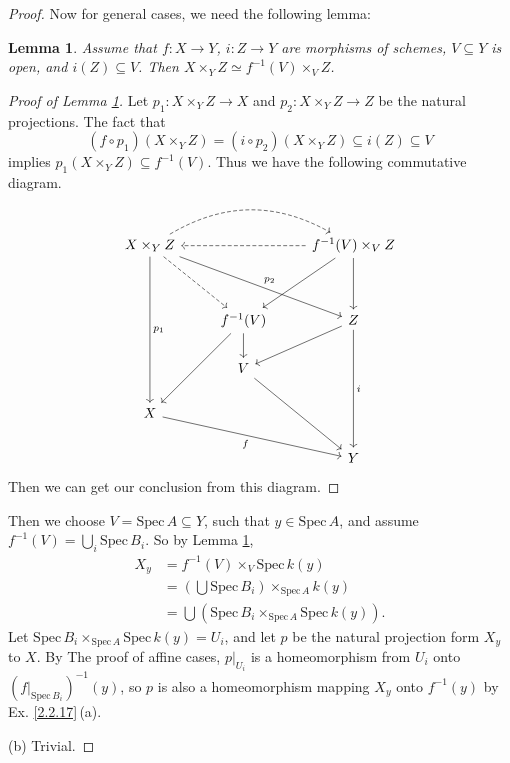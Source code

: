 \documentclass{amsart}
\newtheorem{lm}[theorem]{Lemma}
\begin{document}
\begin{proof}
	Now for general cases, we need the following lemma:
	\begin{lm}
		\label{l12}
		Assume that $f:X\rightarrow Y$, $i:Z\rightarrow Y$ are morphisms of schemes, $V\subseteq Y$ is open, and $i(Z)\subseteq V$. Then $X\times_YZ\simeq f^{-1}(V)\times_VZ$.
	\end{lm}
    \begin{proof}[Proof of Lemma \ref*{l12}]
    	Let $p_1:X\times_YZ\to X$ and $p_2:X\times_YZ\to Z$ be the natural projections. The fact that $$(f\circ p_1)(X\times_YZ)=(i\circ p_2)(X\times_YZ)\subseteq i(Z)\subseteq V$$implies $p_1(X\times_YZ)\subseteq f^{-1}(V)$. Thus we have the following commutative diagram.
    	\begin{equation*}
    	\begin{tikzcd}
    	X\times_YZ \arrow[dddd, "p_1"] \arrow[rrdd, "p_2"] \arrow[rdd, dashed] \arrow[rr, dashed, bend left] &                                 & f^{-1}(V)\times_VZ \arrow[ldd] \arrow[dd] \arrow[ll, dashed] \\
    	&                                 &                                                              \\
    	& f^{-1}(V) \arrow[ldd] \arrow[d] & Z \arrow[ddd, "i"] \arrow[ld]                                \\
    	& V \arrow[rdd]                   &                                                              \\
    	X \arrow[rrd, "f"']                                                                                  &                                 &                                                              \\
    	&                                 & Y                                                           
    	\end{tikzcd}
    	\end{equation*}
    	Then we can get our conclusion from this diagram.
    \end{proof}
	Then we choose $V=\mathrm{Spec}\, A\subseteq Y$, such that $y\in \mathrm{Spec}\, A$, and assume $f^{-1}(V)=\bigcup_i \mathrm{Spec}\, B_i$.
	So by Lemma \ref{l12},
	\begin{align*}
	X_y&=f^{-1}(V)\times_V\mathrm{Spec}\,k(y)\\
	&=\left(\bigcup \mathrm{Spec}\, B_i\right)\times_{\mathrm{Spec}\, A}k(y)\\
	&=\bigcup (\mathrm{Spec}\, B_i\times_{\mathrm{Spec}\, A}\mathrm{Spec}\,k(y)).
	\end{align*}
	Let $\mathrm{Spec}\, B_i\times_{\mathrm{Spec}\,A}\mathrm{Spec}\,k(y)=U_i$, and let $p$ be the natural
	projection form $X_y$ to $X$. By The proof of affine cases, $p|_{U_i}$ is a homeomorphism from $U_i$ onto $(f|_{\mathrm{Spec}\, B_i})^{-1}(y)$, so $p$ is also a homeomorphism mapping $X_y$ onto $f^{-1}(y)$ by Ex. \ref{2.2.17}\,(a).
	
	(b) Trivial.
\end{proof}
\end{document}
